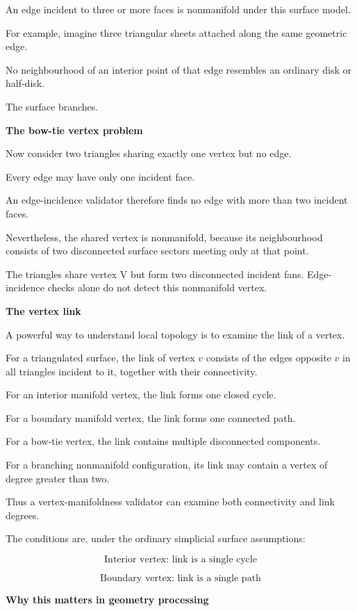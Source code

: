 An edge incident to three or more faces is nonmanifold under this surface model.

For example, imagine three triangular sheets attached along the same geometric edge.

No neighbourhood of an interior point of that edge resembles an ordinary disk or half-disk.

The surface branches.

\textbf{The bow-tie vertex problem}

Now consider two triangles sharing exactly one vertex but no edge.

Every edge may have only one incident face.

An edge-incidence validator therefore finds no edge with more than two incident faces.

Nevertheless, the shared vertex is nonmanifold, because its neighbourhood consists of two disconnected surface sectors meeting only at that point.

The triangles share vertex V but form two disconnected incident fans. Edge-incidence checks alone do not detect this nonmanifold vertex.

\textbf{The vertex link}

A powerful way to understand local topology is to examine the link of a vertex.

For a triangulated surface, the link of vertex \(v\) consists of the edges opposite \(v\) in all triangles incident to it, together with their connectivity.

For an interior manifold vertex, the link forms one closed cycle.

For a boundary manifold vertex, the link forms one connected path.

For a bow-tie vertex, the link contains multiple disconnected components.

For a branching nonmanifold configuration, its link may contain a vertex of degree greater than two.

Thus a vertex-manifoldness validator can examine both connectivity and link degrees.

The conditions are, under the ordinary simplicial surface assumptions:

\[
\boxed{ \text{Interior vertex: link is a single cycle} }
\]

\[
\boxed{ \text{Boundary vertex: link is a single path} }
\]

\textbf{Why this matters in geometry processing}

